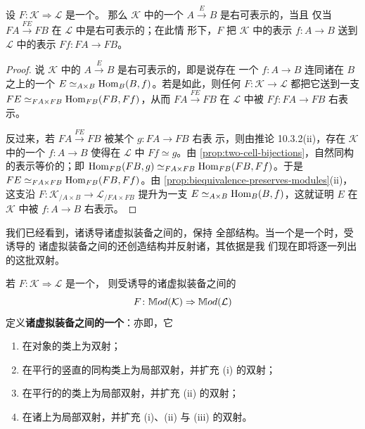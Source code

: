 \begin{proposition}\label{prop:right-representability-invariance}
设 $F\colon\mathcal{K}\Rightarrow\mathcal{L}$ 是一个\trCosmologicalBiequivalence。
那么 $\mathcal{K}$ 中的一个\trModule{} $A\xrightarrow{E}B$ 是右可表示的，当且
仅当\trModule{} $FA\xrightarrow{FE}FB$ 在 $\mathcal{L}$ 中是右可表示的；在此情
形下，$F$ 把 $\mathcal{K}$ 中的表示\trFunctor{} $f\colon A\to B$ 送到
$\mathcal{L}$ 中的表示\trFunctor{} $Ff\colon FA\to FB$。
\end{proposition}

\begin{proof}
说 $\mathcal{K}$ 中的\trModule{} $A\xrightarrow{E}B$ 是右可表示的，即是说存在
一个\trFunctor{} $f\colon A\to B$ 连同诸\trModule{}在 $B$ 之上的一个%
\trEquivalence{} $E\simeq_{A\times B}\mathrm{Hom}_{B}(B,f)$。若是如此，则任何%
\trCosmologicalFunctor{}
$F\colon\mathcal{K}\to\mathcal{L}$ 都把它送到一支\trFiberedEquivalence{}
$FE\simeq_{FA\times FB}\mathrm{Hom}_{FB}(FB,Ff)$，从而\trModule{}
$FA\xrightarrow{FE}FB$ 在 $\mathcal{L}$ 中被 $Ff\colon FA\to FB$ 右表示。

反过来，若 $FA\xrightarrow{FE}FB$ 被某个\trFunctor{} $g\colon FA\to FB$ 右表
示，则由推论 10.3.2(ii)，存在 $\mathcal{K}$ 中的一个\trFunctor{}
$f\colon A\to B$ 使得在 $\mathcal{L}$ 中 $Ff\simeq g$。由
\cref{prop:two-cell-bijections}，自然同构的\trFunctor{}表示等价的\trModule；即
$\mathrm{Hom}_{FB}(FB,g)\simeq_{FA\times FB}\mathrm{Hom}_{FB}(FB,Ff)$。于是
$FE\simeq_{FA\times FB}\mathrm{Hom}_{FB}(FB,Ff)$。由
\cref{prop:biequivalence-preserves-modules}(ii)，这支\trFiberedEquivalence{}沿%
\trCosmologicalFunctor{}
$F\colon\mathcal{K}_{/A\times B}\to\mathcal{L}_{/FA\times FB}$ 提升为一支%
\trFiberedEquivalence{} $E\simeq_{A\times B}\mathrm{Hom}_{B}(B,f)$，这就证明 $E$ 在
$\mathcal{K}$ 中被 $f\colon A\to B$ 右表示。
\end{proof}

我们已经看到，诸\trCosmologicalFunctor{}诱导诸虚拟装备之间的\trFunctor，保持
全部结构。当一个\trCosmologicalFunctor{}是一个\trBiequivalence{}时，受诱导的
诸虚拟装备之间的\trFunctor{}还创造结构并反射诸\trUniversalProperty，其依据是我
们现在即将逐一列出的这批双射。

\begin{theorem}\label{thm:biequivalence-of-virtual-equipments}
若 $F\colon\mathcal{K}\Rightarrow\mathcal{L}$ 是一个\trCosmologicalBiequivalence，
则受诱导的诸虚拟装备之间的\trFunctor
\begin{equation*}
F\colon \mathbb{M}od(\mathcal{K})\Rightarrow\mathbb{M}od(\mathcal{L})
\end{equation*}
定义\textbf{诸虚拟装备之间的一个\trBiequivalence}：亦即，它
\begin{enumerate}[label=(\roman*)]
\item 在对象的\trEquivalence{}类上为双射；
\item 在平行的竖直\trFunctor{}的同构类上为局部双射，并扩充 (i) 的双射；
\item 在平行的\trModule{}的\trEquivalence{}类上为局部双射，并扩充 (ii) 的双射；
\item 在诸\trCell{}上为局部双射，并扩充 (i)、(ii) 与 (iii) 的双射。
\end{enumerate}
\end{theorem}

